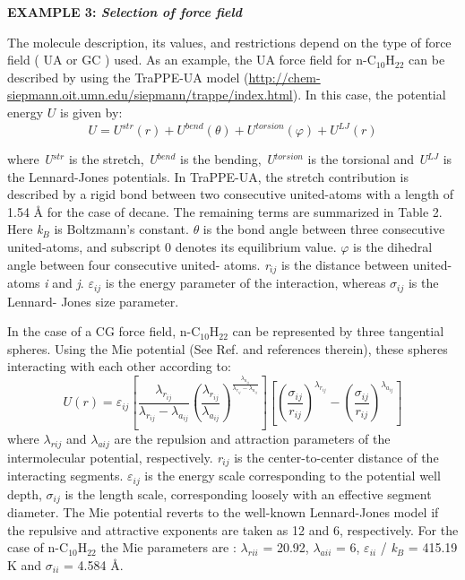 \documentclass[9pt,bestpractices]{livecoms}
\begin{document}
\begin{mdframed}[linewidth=0pt,backgroundcolor=LiveCoMSLightBlue!8,fontcolor=LiveCoMSDarkBlue!80!black]
  \textbf{EXAMPLE 3: \textit{Selection of force field}}

The molecule description, its values, and restrictions depend on the type of
force field ( UA or GC ) used. As an example, the UA force field for
n-C$_{10}$H$_{22}$ can be described by using the TraPPE-UA model (\url{http://chem-siepmann.oit.umn.edu/siepmann/trappe/index.html}).
In this case, the potential energy $U$ is given by:
\begin{equation}
U=U^{str}\left(r\right)+U^{bend}\left(\theta\right)+U^{torsion}\left(\varphi\right)+U^{LJ}\left(r\right)
\end{equation}

where \textit{U}$^{str}$ is the stretch, \textit{U}$^{bend}$ is the bending,
\textit{U}$^{torsion}$ is the torsional and \textit{U}$^{LJ}$ is the
Lennard-Jones potentials. In TraPPE-UA, the stretch contribution is described
by a rigid bond between two consecutive united-atoms with a length of 1.54
\AA{} for the case of decane. The remaining terms are summarized in Table 2.
Here \textit{k}$_{B}$ is Boltzmann's constant. ${\theta}$ is the bond angle between
three consecutive united-atoms, and subscript 0 denotes its equilibrium value.
${\varphi}$ is the dihedral angle between four consecutive united- atoms.
\textit{r}$_{ij}$ is the distance between united-atoms \textit{i} and
\textit{j}. ${\varepsilon}$$_{ij}$ is the energy parameter of the interaction,
whereas ${\sigma}$$_{ij}$ is the Lennard- Jones size parameter. 

In the case of a CG force field, n-C$_{10}$H$_{22}$ can be represented by three
tangential spheres. Using the Mie potential (See Ref. \citep{muller2014} and
references therein), these spheres interacting with each other according to:
\begin{equation}
U\left(r\right)=\varepsilon_{ij}\left[\frac{\lambda_{r_{ij}}}{\lambda_{r_{ij}}-\lambda_{a_{ij}}}\left(\frac{\lambda_{r_{ij}}}{\lambda_{a_{ij}}}\right)^{\frac{\lambda_{a_{ij}}}{\lambda_{r_{ij}}-\lambda_{a_{ij}}}}\right]\left[\left(\frac{\sigma_{ij}}{r_{ij}}\right)^{\lambda_{r_{ij}}}-\left(\frac{\sigma_{ij}}{r_{ij}}\right)^{\lambda_{a_{ij}}}\right]
\end{equation}
where {${\lambda}$}$_{rij}$ and {${\lambda}$}$_{aij}$ are the repulsion and
attraction parameters of the intermolecular potential, respectively.
\textit{r}$_{ij}$ is the center-to-center distance of the interacting segments.
${\varepsilon}$$_{ij}$ is the energy scale corresponding to the potential well
depth, ${\sigma}$$_{ij}$ is the length scale, corresponding loosely with an
effective segment diameter. The Mie potential reverts to the well-known
Lennard-Jones model if the repulsive and attractive exponents are taken as 12
and 6, respectively. For the case of n-C$_{10}$H$_{22}$ the Mie parameters are
\citep{mejia2014a}:
{${\lambda}$}$_{rii}$ = 20.92, {${\lambda}$}$_{aii}$ = 6,
${\varepsilon}$$_{ii}$ / \textit{k}$_{B}$ = 415.19 K and ${\sigma}$$_{ii}$
= 4.584 \AA{}.


\end{mdframed}
\end{document}

